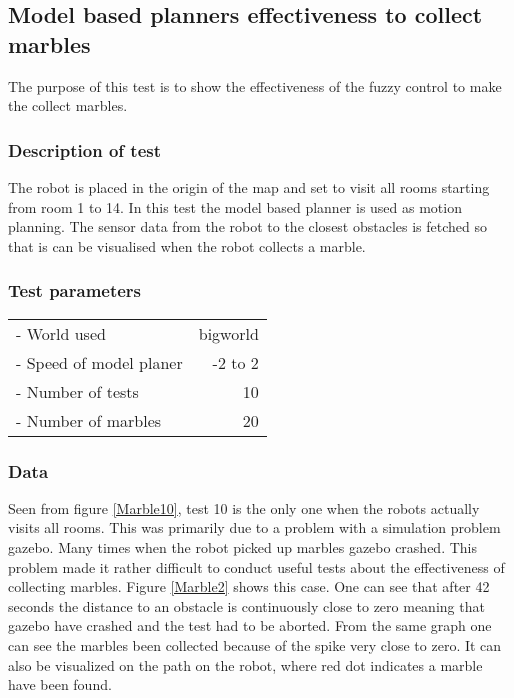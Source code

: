 \documentclass[../Head/Main.tex]{subfiles}
\begin{document}
\subsection{Model based planners effectiveness to collect marbles}
\label{subsec:testCollectMarbles}

The purpose of this test is to show the effectiveness of the fuzzy control to make the collect marbles. 

\subsubsection*{Description of test}  

The robot is placed in the origin of the map and set to visit all rooms starting from room 1 to 14. In this test the model based planner is used as motion planning. The sensor data from the robot to the closest obstacles is fetched so that is can be visualised when the robot collects a marble.         

\subsubsection*{Test parameters}

\begin{tabular}{l r}
	- World used                & bigworld\\	
	- Speed of model planer     & -2 to 2\\
	- Number of tests           & 10 \\
	- Number of marbles         & 20
\end{tabular}

\subsubsection*{Data}
Seen from figure \ref{Marble10}, test 10 is the only one when the robots actually visits all rooms. This was primarily due to a problem with a simulation problem gazebo. Many times when the robot picked up marbles gazebo crashed. This problem made it rather difficult to conduct useful tests about the effectiveness of collecting marbles. Figure \ref{Marble2} shows this case. One can see that after 42 seconds the distance to an obstacle is continuously close to zero meaning that gazebo have crashed and the test had to be aborted. From the same graph one can see the marbles been collected because of the spike very close to zero. It can also be visualized on the path on the robot, where red dot indicates a marble have been found.              
\end{document}
